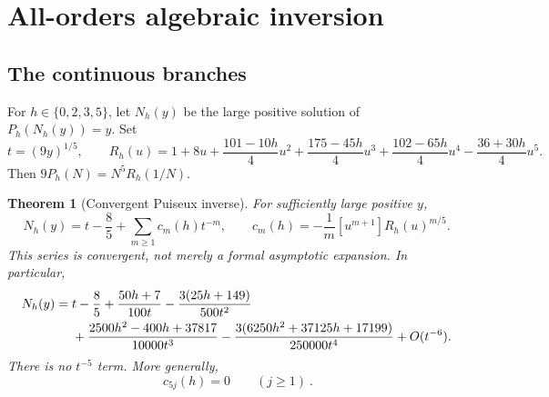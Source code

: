 \documentclass[11pt,a4paper]{article}
\numberwithin{equation}{section}
\newtheorem{theorem}{Theorem}[section]
\theoremstyle{definition}
\begin{document}
\section{All-orders algebraic inversion}\label{pyf:sec:inverse}

\subsection{The continuous branches}

For $h\in\{0,2,3,5\}$, let $N_h(y)$ be the large positive solution of
$P_h(N_h(y))=y$. Set
\begin{equation}\label{pyf:eq:tyR}
t=(9y)^{1/5},\qquad
R_h(u)=1+8u+\frac{101-10h}{4}u^2+\frac{175-45h}{4}u^3
 +\frac{102-65h}{4}u^4-\frac{36+30h}{4}u^5.
\end{equation}
Then $9P_h(N)=N^5R_h(1/N)$.

\begin{theorem}[Convergent Puiseux inverse]\label{pyf:thm:inverse}
For sufficiently large positive $y$,
\begin{equation}\label{pyf:eq:inverseall}
N_h(y)=t-\frac85+\sum_{m\geq1}c_m(h)t^{-m},
\qquad
c_m(h)=-\frac1m[u^{m+1}]R_h(u)^{m/5}.
\end{equation}
This series is convergent, not merely a formal asymptotic expansion.
In particular,
\begin{align}\label{pyf:eq:inversefirst}
N_h(y)={}&t-\frac85+\frac{50h+7}{100t}
 -\frac{3(25h+149)}{500t^2}\notag\\
&+\frac{2500h^2-400h+37817}{10000t^3}
 -\frac{3(6250h^2+37125h+17199)}{250000t^4}
 +O(t^{-6}).
\end{align}
There is no $t^{-5}$ term. More generally,
\begin{equation}\label{pyf:eq:lacunarity}
\boxed{\ c_{5j}(h)=0\qquad(j\geq1)\ }.
\end{equation}
\end{theorem}
\end{document}
